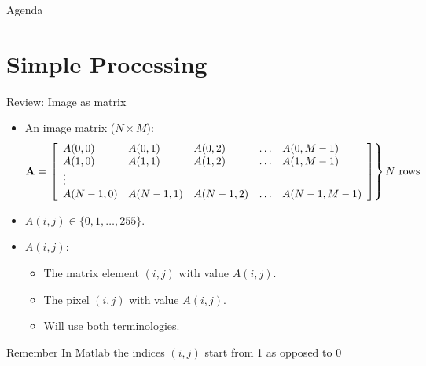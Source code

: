 
%
%
\begin{slide}{Agenda}
\tableofcontents
\end{slide}


\section{Simple Processing}

%
%
\begin{slide}{Review: Image as matrix}

\begin{itemize} %
\small
\item<2-> An image matrix ($N\times M$):
{\scriptsize
\begin{eqnarray*} 
{\bf A}=
\left.
\left[
    \begin{array}{lllll}
    A(0,0)&A(0,1)&A(0,2)&\ldots &A(0,M-1) \\
    A(1,0)&A(1,1)&A(1,2)&\ldots &A(1,M-1) \\ \vdots \\
    A(N-1,0)&A(N-1,1)&A(N-1,2)&\ldots &A(N-1,M-1)
    \end{array}
\right] %
\right\} N\ \mbox{rows} 
\end{eqnarray*}
}
      
\item<3->  $A(i,j)\in \{0,1,\ldots,255\}$.
\item<4->  $A(i,j)$:
    \begin{itemize}
    \small
        \item {}
        The matrix element $(i,j)$ with value $A(i,j)$.
        \item {}
        The pixel $(i,j)$ with value $A(i,j)$.
        \item Will use both terminologies.
    \end{itemize}

\end{itemize}
\begin{alertblock}{Remember}
In Matlab the indices $(i,j)$ start from 1 as opposed to 0
\end{alertblock}

\end{slide}


